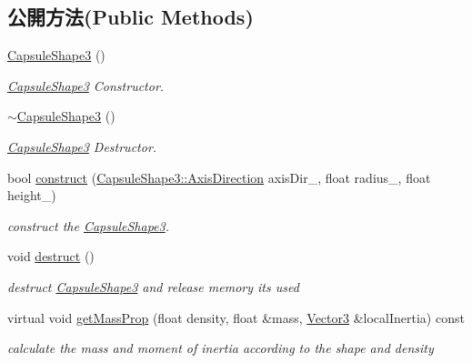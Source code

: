 \subsection*{公開方法(Public Methods)}
\begin{DoxyCompactItemize}
\item 
\hyperlink{class_i_dream_sky_1_1_capsule_shape3_a460283ca8b9d21b33e2288b4aa0cb7e7}{Capsule\+Shape3} ()
\begin{DoxyCompactList}\small\item\em \hyperlink{class_i_dream_sky_1_1_capsule_shape3}{Capsule\+Shape3} Constructor. \end{DoxyCompactList}\item 
\hyperlink{class_i_dream_sky_1_1_capsule_shape3_a6eda81a62f423445f8f57d7daf3278b7}{$\sim$\+Capsule\+Shape3} ()
\begin{DoxyCompactList}\small\item\em \hyperlink{class_i_dream_sky_1_1_capsule_shape3}{Capsule\+Shape3} Destructor. \end{DoxyCompactList}\item 
bool \hyperlink{class_i_dream_sky_1_1_capsule_shape3_aaa4eed50b454b4d54b2405b534ec0fca}{construct} (\hyperlink{class_i_dream_sky_1_1_capsule_shape3_a435aa30527ec5f54ddb8242904e50d13}{Capsule\+Shape3\+::\+Axis\+Direction} axis\+Dir\+\_\+, float radius\+\_\+, float height\+\_\+)
\begin{DoxyCompactList}\small\item\em construct the \hyperlink{class_i_dream_sky_1_1_capsule_shape3}{Capsule\+Shape3}. \end{DoxyCompactList}\item 
void \hyperlink{class_i_dream_sky_1_1_capsule_shape3_a38ec7d7403489738e55ddf21125f6bbc}{destruct} ()\hypertarget{class_i_dream_sky_1_1_capsule_shape3_a38ec7d7403489738e55ddf21125f6bbc}{}\label{class_i_dream_sky_1_1_capsule_shape3_a38ec7d7403489738e55ddf21125f6bbc}

\begin{DoxyCompactList}\small\item\em destruct \hyperlink{class_i_dream_sky_1_1_capsule_shape3}{Capsule\+Shape3} and release memory its used \end{DoxyCompactList}\item 
virtual void \hyperlink{class_i_dream_sky_1_1_capsule_shape3_a95ce60deb958461f0d7216819c56f798}{get\+Mass\+Prop} (float density, float \&mass, \hyperlink{class_i_dream_sky_1_1_vector3}{Vector3} \&local\+Inertia) const 
\begin{DoxyCompactList}\small\item\em calculate the mass and moment of inertia according to the shape and density \end{DoxyCompactList}\end{DoxyCompactItemize}
